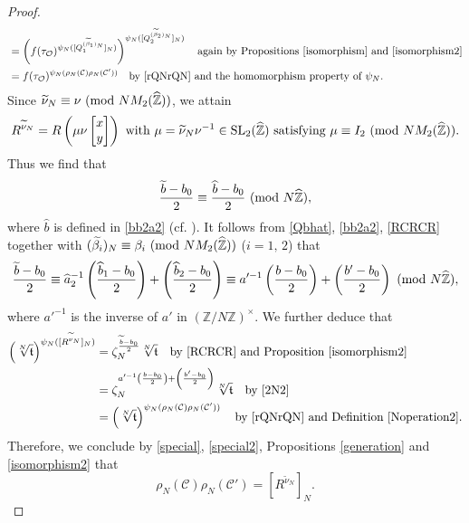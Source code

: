 \documentclass[reqno,11pt]{article}
\newcommand{\Mod}[1]{\ (\textup{mod}\ #1)}
\theoremstyle{plain} %
\theoremstyle{definition} %
\begin{document}
\begin{proof}
\begin{equation}
\begin{aligned}
&=\left(f(\tau_\mathcal{O})^{\psi_N([Q_1^{(\widetilde{\beta}_1)_N}]_N)}
\right)^{\psi_N([Q_2^{(\widetilde{\beta}_2)_N}]_N)}
\quad\textrm{again by Propositions \ref{isomorphism} and \ref{isomorphism2}}\\
&=f(\tau_\mathcal{O})^{\psi_N(\rho_N(\mathcal{C})
\rho_N(\mathcal{C}'))}\quad\textrm{by \eqref{rQNrQN} and the homomorphism property of $\psi_N$}.
\end{aligned}
\end{equation}
Since $\widetilde{\nu}_N\equiv\nu\Mod{NM_2(\widehat{\mathbb{Z}})}$, 
we attain
\begin{equation*}
R^{\widetilde{\nu}_N}=
R\left(\mu\nu\begin{bmatrix}x\\y\end{bmatrix}\right)
~\textrm{with}~\mu=\widetilde{\nu}_N\nu^{-1}\in\mathrm{SL}_2(\widehat{\mathbb{Z}})~
\textrm{satisfying}~\mu\equiv I_2\Mod{NM_2(\widehat{\mathbb{Z}})}. 
\end{equation*}
Thus we find that
\begin{equation*}
\frac{\widetilde{b}-b_0}{2}\equiv
\frac{\widehat{b}-b_0}{2}\Mod{N\widehat{\mathbb{Z}}}, 
\end{equation*}
where $\widehat{b}$ is defined in \eqref{bb2a2}
(cf. \cite[Lemma 12.5]{J-K-S-Y}). It follows from 
\eqref{Qbhat}, \eqref{bb2a2}, \eqref{RCRCR}
together with  
$(\widetilde{\beta_i})_N
\equiv\beta_i
\Mod{NM_2(\widehat{\mathbb Z})}$ ($i=1,\,2$)
that 
\begin{equation}\label{2N2}
\frac{\widetilde{b}-b_0}{2}\equiv
\widehat{a}_2^{-1}\left(\frac{\widehat{b}_1-b_0}{2}\right)
+\left(\frac{\widehat{b}_2-b_0}{2}\right)
\equiv
a'^{-1}\left(\frac{b-b_0}{2}\right)
+\left(\frac{b'-b_0}{2}\right)
\Mod{N\widehat{\mathbb{Z}}}, 
\end{equation}
where $a'^{-1}$ is the inverse of $a'$ in $(\mathbb{Z}/N\mathbb{Z})^\times$. 
We further deduce that
\begin{equation}\label{special2}
\begin{aligned}
\left(\sqrt[N]{\mathfrak{t}}\right)^{\psi_N([R^{\widetilde{\nu}_N}]_N)}&=
\zeta_N^{\frac{\widetilde{b}-b_0}{2}}\sqrt[N]{\mathfrak{t}}\quad\textrm{by 
\eqref{RCRCR} and Proposition \ref{isomorphism2}}\\
&=\zeta_N^{a'^{-1}\left(\frac{b-b_0}{2}\right)
+\left(\frac{b'-b_0}{2}\right)}\sqrt[N]{\mathfrak{t}}\quad\textrm{by \eqref{2N2}}\\
&=\left(\sqrt[N]{\mathfrak{t}}\right)^{\psi_N(\rho_N(\mathcal{C})\rho_N(\mathcal{C}'))}
\quad\textrm{by \eqref{rQNrQN} and Definition \ref{Noperation2}}. 
\end{aligned}
\end{equation}
Therefore, we conclude by \eqref{special},
\eqref{special2}, Propositions \ref{generation} and  \ref{isomorphism2} that
\begin{equation*}
\rho_N(\mathcal{C})\rho_N(\mathcal{C}')=[R^{\widetilde{\nu}_N}]_N.
\end{equation*}
\end{proof}
\end{document}
